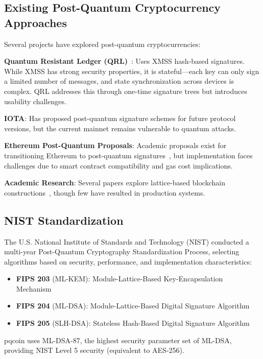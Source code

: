 \documentclass[11pt,a4paper]{article}
\begin{document}
\subsection{Existing Post-Quantum Cryptocurrency Approaches}

Several projects have explored post-quantum cryptocurrencies:

\textbf{Quantum Resistant Ledger (QRL)}~\cite{qrl}: Uses XMSS hash-based signatures. While XMSS has strong security properties, it is stateful---each key can only sign a limited number of messages, and state synchronization across devices is complex. QRL addresses this through one-time signature trees but introduces usability challenges.

\textbf{IOTA}: Has proposed post-quantum signature schemes for future protocol versions, but the current mainnet remains vulnerable to quantum attacks.

\textbf{Ethereum Post-Quantum Proposals}: Academic proposals exist for transitioning Ethereum to post-quantum signatures~\cite{eth-pq}, but implementation faces challenges due to smart contract compatibility and gas cost implications.

\textbf{Academic Research}: Several papers explore lattice-based blockchain constructions~\cite{esgin2019}, though few have resulted in production systems.

\subsection{NIST Standardization}

The U.S. National Institute of Standards and Technology (NIST) conducted a multi-year Post-Quantum Cryptography Standardization Process, selecting algorithms based on security, performance, and implementation characteristics:

\begin{itemize}
    \item \textbf{FIPS 203} (ML-KEM): Module-Lattice-Based Key-Encapsulation Mechanism~\cite{fips203}
    \item \textbf{FIPS 204} (ML-DSA): Module-Lattice-Based Digital Signature Algorithm~\cite{fips204}
    \item \textbf{FIPS 205} (SLH-DSA): Stateless Hash-Based Digital Signature Algorithm
\end{itemize}

pqcoin uses ML-DSA-87, the highest security parameter set of ML-DSA, providing NIST Level 5 security (equivalent to AES-256).
\end{document}
